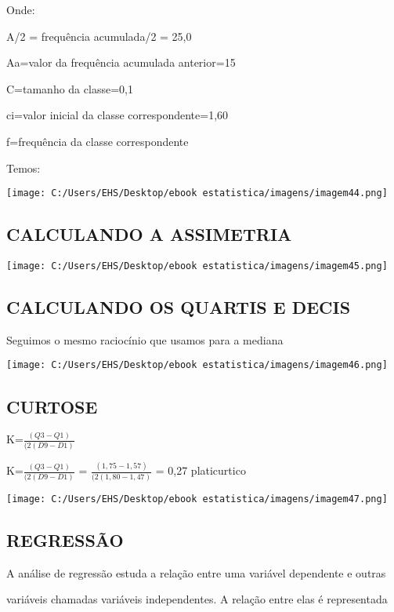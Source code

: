 \documentclass[]{book}
\begin{document}
Onde:

A/2 = frequência acumulada/2 = 25,0

Aa=valor da frequência acumulada anterior=15

C=tamanho da classe=0,1

ci=valor inicial da classe correspondente=1,60

f=frequência da classe correspondente

Temos:

\texttt{[image: C:/Users/EHS/Desktop/ebook estatistica/imagens/imagem44.png]}

\hypertarget{calculando-a-assimetria-2}{%
\subsection{CALCULANDO A ASSIMETRIA}\label{calculando-a-assimetria-2}}

\texttt{[image: C:/Users/EHS/Desktop/ebook estatistica/imagens/imagem45.png]}

\hypertarget{calculando-os-quartis-e-decis}{%
\subsection{CALCULANDO OS QUARTIS E DECIS}\label{calculando-os-quartis-e-decis}}

Seguimos o mesmo raciocínio que usamos para a mediana

\texttt{[image: C:/Users/EHS/Desktop/ebook estatistica/imagens/imagem46.png]}

\hypertarget{curtose-1}{%
\subsection{CURTOSE}\label{curtose-1}}

K=\(\frac{(Q3-Q1)}{(2(D9-D1)}\)

K=\(\frac{(Q3-Q1)}{(2(D9-D1)}\) = \(\frac{(1,75-1,57)}{(2(1,80-1,47)}\) = 0,27 platicurtico

\texttt{[image: C:/Users/EHS/Desktop/ebook estatistica/imagens/imagem47.png]}

\hypertarget{regressao}{%
\subsection{REGRESSÃO}\label{regressao}}

A análise de regressão estuda a relação entre uma variável dependente e outras

variáveis chamadas variáveis independentes. A relação entre elas é representada
\end{document}
